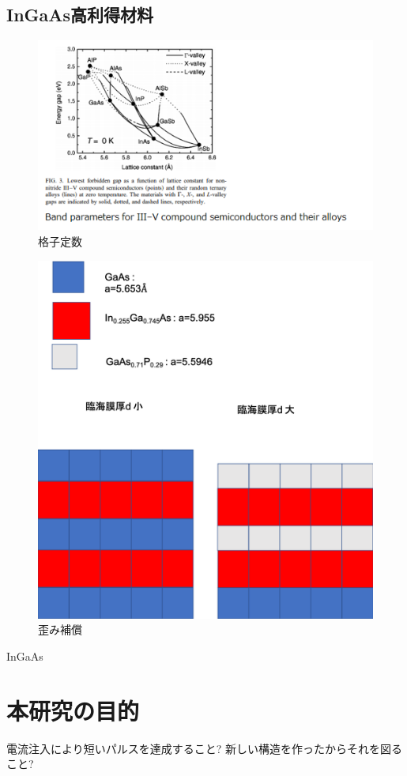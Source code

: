 \subsection{InGaAs高利得材料}

\begin{figure}[h]
	\centering
	\includegraphics[width=15cm]{figure/fig_1_1_lattice_constance.png}
	\caption{格子定数}
	\label{fig:fig_latice_constancce}
\end{figure}

\begin{figure}[h]
	\centering
	\includegraphics[width=15cm]{figure/fig_1_1_lattice_strain.png}
	\caption{歪み補償}
	\label{fig:fig_1_1_GS_pulse}
\end{figure}
InGaAs
\clearpage
\section{本研究の目的}
電流注入により短いパルスを達成すること?
新しい構造を作ったからそれを図ること?
